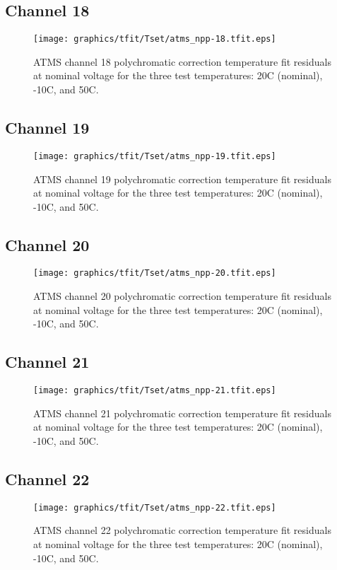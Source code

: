 \subsection{Channel 18}
\begin{figure}[H]
  \label{fig:Tset.ch18_tfit}
  \centering
  \texttt{[image: graphics/tfit/Tset/atms\_npp-18.tfit.eps]}
  \caption{ATMS channel 18 polychromatic correction temperature fit residuals at nominal voltage for the three test temperatures: 20\textdegree{}C (nominal), -10\textdegree{}C, and 50\textdegree{}C.}
\end{figure}

\subsection{Channel 19}
\begin{figure}[H]
  \label{fig:Tset.ch19_tfit}
  \centering
  \texttt{[image: graphics/tfit/Tset/atms\_npp-19.tfit.eps]}
  \caption{ATMS channel 19 polychromatic correction temperature fit residuals at nominal voltage for the three test temperatures: 20\textdegree{}C (nominal), -10\textdegree{}C, and 50\textdegree{}C.}
\end{figure}

\subsection{Channel 20}
\begin{figure}[H]
  \label{fig:Tset.ch20_tfit}
  \centering
  \texttt{[image: graphics/tfit/Tset/atms\_npp-20.tfit.eps]}
  \caption{ATMS channel 20 polychromatic correction temperature fit residuals at nominal voltage for the three test temperatures: 20\textdegree{}C (nominal), -10\textdegree{}C, and 50\textdegree{}C.}
\end{figure}

\subsection{Channel 21}
\begin{figure}[H]
  \label{fig:Tset.ch21_tfit}
  \centering
  \texttt{[image: graphics/tfit/Tset/atms\_npp-21.tfit.eps]}
  \caption{ATMS channel 21 polychromatic correction temperature fit residuals at nominal voltage for the three test temperatures: 20\textdegree{}C (nominal), -10\textdegree{}C, and 50\textdegree{}C.}
\end{figure}

\subsection{Channel 22}
\begin{figure}[H]
  \label{fig:Tset.ch22_tfit}
  \centering
  \texttt{[image: graphics/tfit/Tset/atms\_npp-22.tfit.eps]}
  \caption{ATMS channel 22 polychromatic correction temperature fit residuals at nominal voltage for the three test temperatures: 20\textdegree{}C (nominal), -10\textdegree{}C, and 50\textdegree{}C.}
\end{figure}
